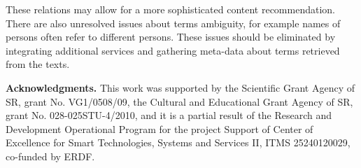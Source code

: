 \documentclass{llncs}
\begin{document}
These relations may allow for a more sophisticated content recommendation. There are also unresolved issues about terms ambiguity, for example names of persons often refer to different persons. These issues should be eliminated by integrating additional services and gathering meta-data about terms retrieved from the texts. 

\textbf{Acknowledgments.} This work was supported by the Scientific Grant Agency of SR, grant No. VG1/0508/09, the Cultural and Educational Grant Agency of SR, grant No. 028-025STU-4/2010, and it is a partial result of the Research and Development Operational Program for the project Support of Center of Excellence for Smart Technologies, Systems and Services II, ITMS 25240120029, co-funded by ERDF. 

\end{document}
